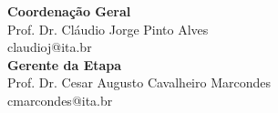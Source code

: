 
\vspace*{2cm}    %
\begin{flushright}
	\textbf{Coordenação Geral}\\
	Prof. Dr. Cláudio Jorge Pinto Alves\\
	claudioj@ita.br\\
	\vspace*{10cm}
	\textbf{Gerente da Etapa}\\
	Prof. Dr. Cesar Augusto Cavalheiro Marcondes\\
	cmarcondes@ita.br
\end{flushright}
